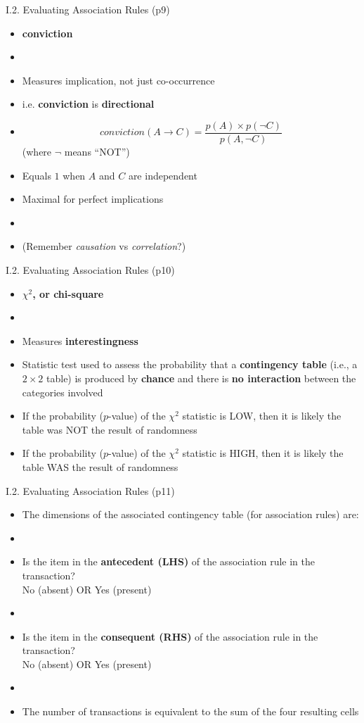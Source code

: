 \documentclass[handout]{beamer}
\newcommand{\strong}[1]{\textbf{\color{teal} #1}}
\newcommand{\stronger}[1]{\textbf{\color{purple} #1}}
\begin{document}
\begin{frame}{I.2. Evaluating Association Rules (p9)}
\begin{itemize}
\item \stronger{conviction}~\cite{brin-et-al:1997}
\item[]
\item Measures implication, not just co-occurrence
\item i.e. \textbf{conviction} is \strong{directional}
\item[]
\[
	conviction( A \rightarrow C ) = 
	\frac{ p(A) \times p(\neg C) }
	     { p(A,\neg C) }
\]
(where $\neg$ means ``NOT'')
\item Equals $1$ when $A$ and $C$ are independent
\item Maximal for perfect implications
\item[]
\item[] (Remember \emph{causation} vs \emph{correlation}?)
\end{itemize}
\end{frame}
\begin{frame}{I.2. Evaluating Association Rules (p10)}
\begin{itemize}
\item[] \stronger{$\chi^2$, or chi-square}
\item[]
\item Measures \strong{interestingness}
\item Statistic test used to assess the probability that a \stronger{contingency table} (i.e., a $2 \times 2$ table) is produced by \strong{chance} and there is \strong{no interaction} between the categories involved
\item If the probability ($p$-value) of the $\chi^2$ statistic is LOW, then it is likely the table was NOT the result of randomness
\item If the probability ($p$-value) of the $\chi^2$ statistic is HIGH, then it is likely the table WAS the result of randomness
\end{itemize}
\end{frame}
\begin{frame}{I.2. Evaluating Association Rules (p11)}
\begin{itemize}
\item[] The dimensions of the associated contingency table (for association rules) are:
\item[]
\item Is the item in the \strong{antecedent (LHS)} of the association rule in the transaction?\\
No (absent) OR Yes (present)
\item[]
\item Is the item in the \strong{consequent (RHS)} of the association rule in the transaction?\\
No (absent) OR Yes (present)
\item[]
\item The number of transactions is equivalent to the sum of the four resulting cells
\end{itemize}
\end{frame}
\end{document}
